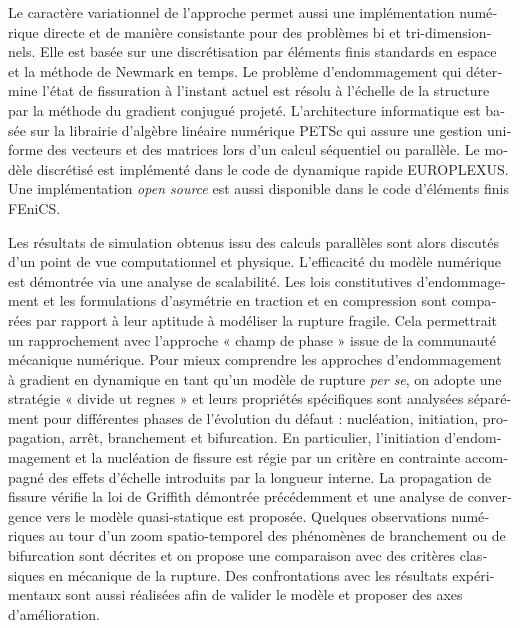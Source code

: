 \begin{otherlanguage}{french}
Le caractère variationnel de l'approche permet aussi une implémentation numérique directe et de manière consistante pour des problèmes bi et tri-dimensionnels. Elle est basée sur une discrétisation par éléments finis standards en espace et la méthode de Newmark en temps. Le problème d'endommagement qui détermine l'état de fissuration à l'instant actuel est résolu à l'échelle de la structure par la méthode du gradient conjugué projeté. L'architecture informatique est basée sur la librairie d'algèbre linéaire numérique PETSc qui assure une gestion uniforme des vecteurs et des matrices lors d'un calcul séquentiel ou parallèle. Le modèle discrétisé est implémenté dans le code de dynamique rapide EUROPLEXUS. Une implémentation \emph{open source} est aussi disponible dans le code d'éléments finis FEniCS. 

Les résultats de simulation obtenus issu des calculs parallèles sont alors discutés d'un point de vue computationnel et physique. L'efficacité du modèle numérique est démontrée via une analyse de scalabilité. Les lois constitutives d'endommagement et les formulations d'asymétrie en traction et en compression sont comparées par rapport à leur aptitude à modéliser la rupture fragile. Cela permettrait un rapprochement avec l'approche « champ de phase » issue de la communauté mécanique numérique. Pour mieux comprendre les approches d'endommagement à gradient en dynamique en tant qu'un modèle de rupture \emph{per se}, on adopte une stratégie « divide ut regnes » et leurs propriétés spécifiques sont analysées séparément pour différentes phases de l'évolution du défaut : nucléation, initiation, propagation, arrêt, branchement et bifurcation. En particulier, l'initiation d'endommagement et la nucléation de fissure est régie par un critère en contrainte accompagné des effets d'échelle introduits par la longueur interne. La propagation de fissure vérifie la loi de Griffith démontrée précédemment et une analyse de convergence vers le modèle quasi-statique est proposée. Quelques observations numériques au tour d'un zoom spatio-temporel des phénomènes de branchement ou de bifurcation sont décrites et on propose une comparaison avec des critères classiques en mécanique de la rupture. Des confrontations avec les résultats expérimentaux sont aussi réalisées afin de valider le modèle et proposer des axes d'amélioration.
\end{otherlanguage}